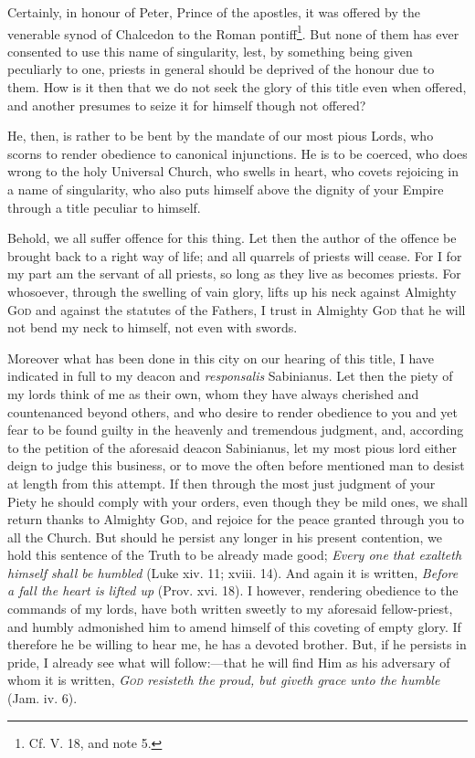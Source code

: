 Certainly, in honour of Peter, Prince of the apostles, it was offered by the venerable synod of Chalcedon to the Roman pontiff\footnote{Cf. V. 18, and note 5.}. But none of them has ever consented to use this name of singularity, lest, by something being given peculiarly to one, priests in general should be deprived of the honour due to them. How is it then that we do not seek the glory of this title even when offered, and another presumes to seize it for himself though not offered?

He, then, is rather to be bent by the mandate of our most pious Lords, who scorns to render obedience to canonical injunctions. He is to be coerced, who does wrong to the holy Universal Church, who swells in heart, who covets rejoicing in a name of singularity, who also puts himself above the dignity of your Empire through a title peculiar to himself.

Behold, we all suffer offence for this thing. Let then the author of the offence be brought back to a right way of life; and all quarrels of priests will cease. For I for my part am the servant of all priests, so long as they live as becomes priests. For whosoever, through the swelling of vain glory, lifts up his neck against Almighty \textsc{God} and against the statutes of the Fathers, I trust in Almighty \textsc{God} that he will not bend my neck to himself, not even with swords.

Moreover what has been done in this city on our hearing of this title, I have indicated in full to my deacon and \emph{responsalis} Sabinianus. Let then the piety of my lords think of me as their own, whom they have always cherished and countenanced beyond others, and who desire to render obedience to you and yet fear to be found guilty in the heavenly and tremendous judgment, and, according to the petition of the aforesaid deacon Sabinianus, let my most pious lord either deign to judge this business, or to move the often before mentioned man to desist at length from this attempt. If then through the most just judgment of your Piety he should comply with your orders, even though they be mild ones, we shall return thanks to Almighty \textsc{God}, and rejoice for the peace granted through you to all the Church. But should he persist any longer in his present contention, we hold this sentence of the Truth to be already made good; \emph{Every one that exalteth himself shall be humbled} (Luke xiv. 11; xviii. 14). And again it is written, \emph{Before a fall the heart is lifted up} (Prov. xvi. 18). I however, rendering obedience to the commands of my lords, have both written sweetly to my aforesaid fellow-priest, and humbly admonished him to amend himself of this coveting of empty glory. If therefore he be willing to hear me, he has a devoted brother. But, if he persists in pride, I already see what will follow:—that he will find Him as his adversary of whom it is written, \emph{\textsc{God} resisteth the proud, but giveth grace unto the humble} (Jam. iv. 6).

